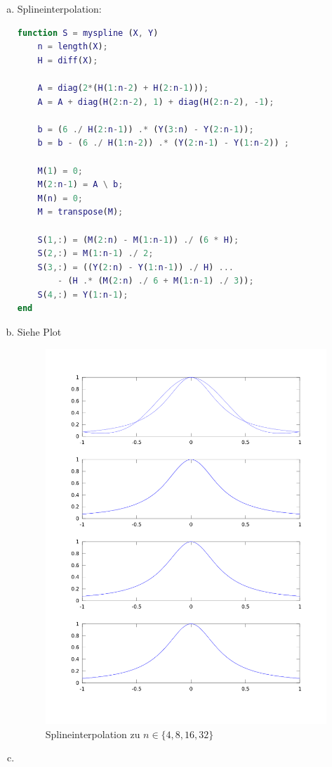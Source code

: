 \documentclass[a4paper]{scrartcl}
\begin{document}
\setcounter{aufgabe}{3}
\begin{aufgabe}
	\begin{enumerate}[a)]
		\item
			Splineinterpolation:
			\begin{lstlisting}[language=matlab,tabsize=4]
% Stephan Hilb, 2706616
function S = myspline (X, Y)
	n = length(X);
	H = diff(X);
	
	A = diag(2*(H(1:n-2) + H(2:n-1)));
	A = A + diag(H(2:n-2), 1) + diag(H(2:n-2), -1);

	b = (6 ./ H(2:n-1)) .* (Y(3:n) - Y(2:n-1));
	b = b - (6 ./ H(1:n-2)) .* (Y(2:n-1) - Y(1:n-2)) ;

	M(1) = 0;
	M(2:n-1) = A \ b;
	M(n) = 0;
	M = transpose(M);

	S(1,:) = (M(2:n) - M(1:n-1)) ./ (6 * H);
	S(2,:) = M(1:n-1) ./ 2;
	S(3,:) = ((Y(2:n) - Y(1:n-1)) ./ H) ...
		- (H .* (M(2:n) ./ 6 + M(1:n-1) ./ 3));
	S(4,:) = Y(1:n-1);
end
			\end{lstlisting}
		\item
			Siehe Plot
		\begin{figure}[h]
			\centering
			\caption{Splineinterpolation zu $n\in \{4,8,16,32\}$}
			\includegraphics[scale=0.5]{num1_5_4/num1_5_4.png}
		\end{figure}
		\item
			~


\end{enumerate}
\end{aufgabe}
\end{document}
